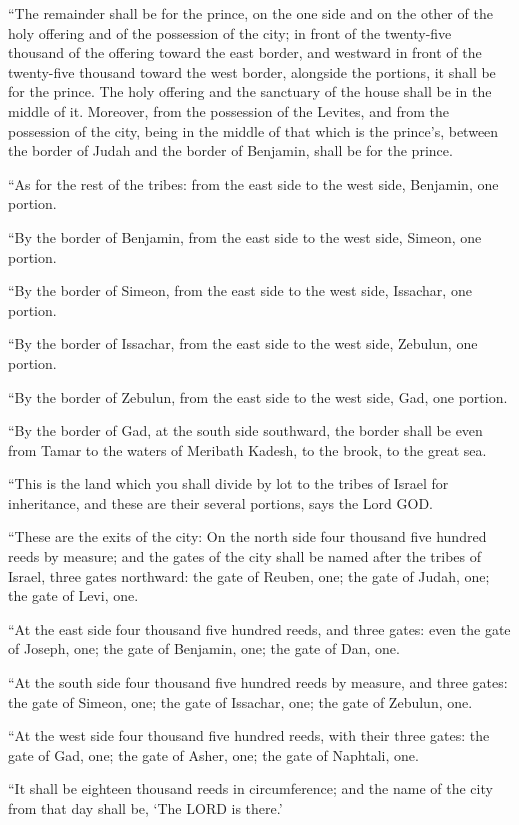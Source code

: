 \myverse{}“The remainder shall be for the prince, on the one side and
on the other of the holy offering and of the possession of the city; in front of the twenty-five thousand
of the offering toward the east border, and westward in front of the twenty-five thousand toward the west
border, alongside the portions, it shall be for the prince. The holy offering and the sanctuary of the
house shall be in the middle of it.
\myverse{}Moreover, from the possession of the Levites, and from the possession of
the city, being in the middle of that which is the prince’s, between the border of Judah and the border
of Benjamin, shall be for the prince.

\myverse{}“As for the rest of the tribes: from the east side to the west
side, Benjamin, one portion.

\myverse{}“By the border of Benjamin, from the east side to the west side,
Simeon, one portion.

\myverse{}“By the border of Simeon, from the east side to the west side,
Issachar, one portion.

\myverse{}“By the border of Issachar, from the east side to the west side,
Zebulun, one portion.

\myverse{}“By the border of Zebulun, from the east side to the west side,
Gad, one portion.

\myverse{}“By the border of Gad, at the south side southward, the border
shall be even from Tamar to the waters of Meribath Kadesh, to the brook, to the great sea.

\myverse{}“This is the land which you shall divide by lot to the tribes
of Israel for inheritance, and these are their several portions, says the Lord GOD.

\myverse{}“These are the exits of the city: On the north side four thousand
five hundred reeds by measure;
\myverse{}and the gates of the city shall be named after the tribes of Israel, three
gates northward: the gate of Reuben, one; the gate of Judah, one; the gate of Levi, one.

\myverse{}“At the east side four thousand five hundred reeds, and three
gates: even the gate of Joseph, one; the gate of Benjamin, one; the gate of Dan, one.

\myverse{}“At the south side four thousand five hundred reeds by measure,
and three gates: the gate of Simeon, one; the gate of Issachar, one; the gate of Zebulun, one.

\myverse{}“At the west side four thousand five hundred reeds, with their
three gates: the gate of Gad, one; the gate of Asher, one; the gate of Naphtali, one.

\myverse{}“It shall be eighteen thousand reeds in circumference; and the
name of the city from that day shall be, ‘The LORD is there.’


